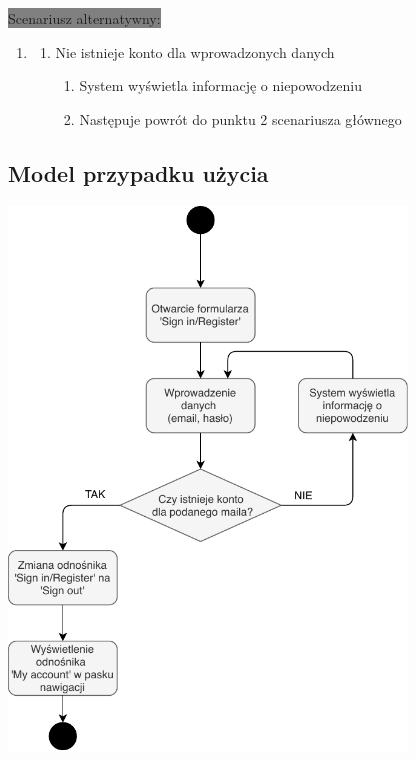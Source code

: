 \documentclass[12pt]{report}
\begin{document}
			\colorbox{grey}{Scenariusz alternatywny:}
			\begin{enumerate}\addtocounter{enumi}{3}
				\item[]
				\begin{enumerate}
					\item Nie istnieje konto dla wprowadzonych danych
					\begin{enumerate}
						\item System wyświetla informację o niepowodzeniu
						\item Następuje powrót do punktu 2 scenariusza głównego
					\end{enumerate}
				\end{enumerate}
			\end{enumerate}
		
		\subsection{Model przypadku użycia}
			\begin{center}
				\includegraphics[width=300pt]{logowanie.pdf}
			\end{center}
			\newpage
\end{document}
